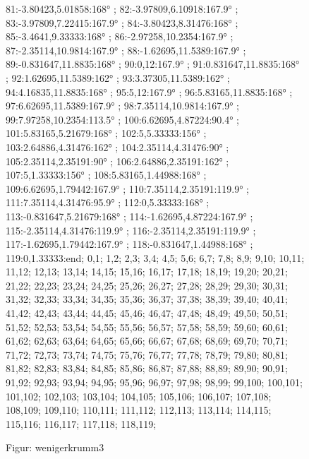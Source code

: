 \documentclass[a4paper,10pt,ngerman]{scrartcl}
\begin{document}
\begin{figure}[!h]
{    81:-3.80423,5.01858:168° ;
    82:-3.97809,6.10918:167.9° ;
    83:-3.97809,7.22415:167.9° ;
    84:-3.80423,8.31476:168° ;
    85:-3.4641,9.33333:168° ;
    86:-2.97258,10.2354:167.9° ;
    87:-2.35114,10.9814:167.9° ;
    88:-1.62695,11.5389:167.9° ;
    89:-0.831647,11.8835:168° ;
    90:0,12:167.9° ;
    91:0.831647,11.8835:168° ;
    92:1.62695,11.5389:162° ;
    93:3.37305,11.5389:162° ;
    94:4.16835,11.8835:168° ;
    95:5,12:167.9° ;
    96:5.83165,11.8835:168° ;
    97:6.62695,11.5389:167.9° ;
    98:7.35114,10.9814:167.9° ;
    99:7.97258,10.2354:113.5° ;
    100:6.62695,4.87224:90.4° ;
    101:5.83165,5.21679:168° ;
    102:5,5.33333:156° ;
    103:2.64886,4.31476:162° ;
    104:2.35114,4.31476:90° ;
    105:2.35114,2.35191:90° ;
    106:2.64886,2.35191:162° ;
    107:5,1.33333:156° ;
    108:5.83165,1.44988:168° ;
    109:6.62695,1.79442:167.9° ;
    110:7.35114,2.35191:119.9° ;
    111:7.35114,4.31476:95.9° ;
    112:0,5.33333:168° ;
    113:-0.831647,5.21679:168° ;
    114:-1.62695,4.87224:167.9° ;
    115:-2.35114,4.31476:119.9° ;
    116:-2.35114,2.35191:119.9° ;
    117:-1.62695,1.79442:167.9° ;
    118:-0.831647,1.44988:168° ;
    119:0,1.33333:end;
}{
0,1;
1,2;
2,3;
3,4;
4,5;
5,6;
6,7;
7,8;
8,9;
9,10;
10,11;
11,12;
12,13;
13,14;
14,15;
15,16;
16,17;
17,18;
18,19;
19,20;
20,21;
21,22;
22,23;
23,24;
24,25;
25,26;
26,27;
27,28;
28,29;
29,30;
30,31;
31,32;
32,33;
33,34;
34,35;
35,36;
36,37;
37,38;
38,39;
39,40;
40,41;
41,42;
42,43;
43,44;
44,45;
45,46;
46,47;
47,48;
48,49;
49,50;
50,51;
51,52;
52,53;
53,54;
54,55;
55,56;
56,57;
57,58;
58,59;
59,60;
60,61;
61,62;
62,63;
63,64;
64,65;
65,66;
66,67;
67,68;
68,69;
69,70;
70,71;
71,72;
72,73;
73,74;
74,75;
75,76;
76,77;
77,78;
78,79;
79,80;
80,81;
81,82;
82,83;
83,84;
84,85;
85,86;
86,87;
87,88;
88,89;
89,90;
90,91;
91,92;
92,93;
93,94;
94,95;
95,96;
96,97;
97,98;
98,99;
99,100;
100,101;
101,102;
102,103;
103,104;
104,105;
105,106;
106,107;
107,108;
108,109;
109,110;
110,111;
111,112;
112,113;
113,114;
114,115;
115,116;
116,117;
117,118;
118,119;
}
\caption{Figur: wenigerkrumm3}
\label{fig:wenigerkrumm3}
\end{figure}
\newpage
\end{document}
